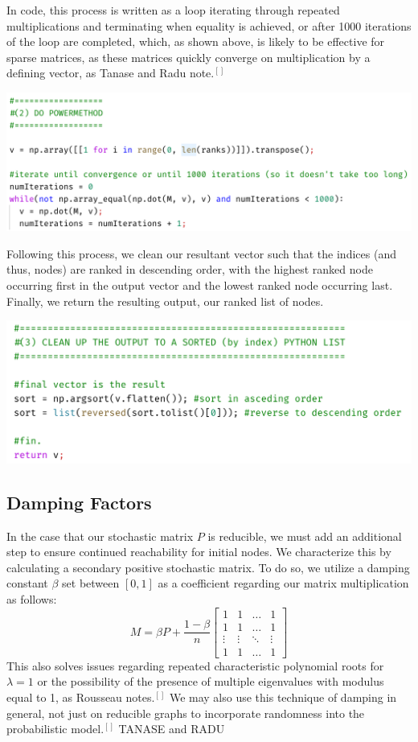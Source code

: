 \documentclass{article}
\begin{document}
    \noindent
    In code, this process is written as a loop iterating through repeated multiplications and terminating when equality is achieved, or after 1000 iterations of the loop are completed, which, as shown above, is likely to be effective for sparse matrices, as these matrices quickly converge on multiplication by a defining vector, as Tanase and Radu note.$^{[]}$
    \begin{center}
        \includegraphics[scale=.6]{snip2}
    \end{center}
    Following this process, we clean our resultant vector such that the indices (and thus, nodes) are ranked in descending order, with the highest ranked node occurring first in the output vector and the lowest ranked node occurring last. Finally, we return the resulting output, our ranked list of nodes.
    
    \begin{center}
        \includegraphics[scale=.6]{snip3}
    \end{center}
    
    \subsection{Damping Factors}
    In the case that our stochastic matrix $P$ is reducible, we must add an additional step to ensure continued reachability for initial nodes. We characterize this by calculating a secondary positive stochastic matrix. To do so, we utilize a damping constant $\beta$ set between $[0,1]$ as a coefficient regarding our matrix multiplication as follows: 
    $$
    M = \beta P + \frac{1-\beta}{n} \begin{bmatrix} 1 & 1 & \ldots & 1 \\ 1 & 1 & \ldots & 1 \\ \vdots & \vdots & \ddots & \vdots \\ 1 & 1 & \ldots & 1 \end{bmatrix}
    $$
    This also solves issues regarding repeated characteristic polynomial roots for $\lambda = 1$ or the possibility of the presence of multiple eigenvalues with modulus equal to 1, as Rousseau notes.$^{[]}$ We may also use this technique of damping in general, not just on reducible graphs to incorporate randomness into the probabilistic model.$^{[]}$ TANASE and RADU
    
\end{document}
